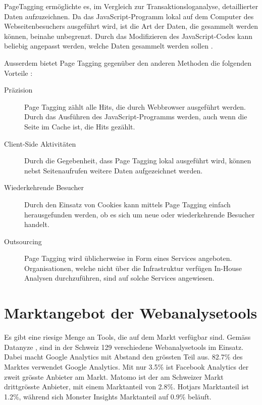 PageTagging ermöglichte es, im Vergleich zur Transaktionsloganalyse, detaillierter Daten aufzuzeichnen. Da das JavaScript-Programm lokal auf dem Computer des Webseitenbesuchers ausgeführt wird, ist die Art der Daten, die gesammelt werden können, beinahe unbegrenzt. Durch das Modifizieren des JavaScript-Codes kann beliebig angepasst werden, welche Daten gesammelt werden sollen \parencite[S. 3]{waisberg2009webShort}. 

Ausserdem bietet Page Tagging gegenüber den anderen Methoden die folgenden Vorteile \parencite[S. 174]{nakatani2011toolselectionmethod}:

\begin{description}
  \item[Präzision] Page Tagging zählt alle Hits, die durch Webbrowser ausgeführt werden. Durch das Ausführen des JavaScript-Programms werden, auch wenn die Seite im Cache ist, die Hits gezählt.
  \item[Client-Side Aktivitäten] Durch die Gegebenheit, dass Page Tagging lokal ausgeführt wird, können nebst Seitenaufrufen weitere Daten aufgezeichnet werden.
  \item[Wiederkehrende Besucher] Durch den Einsatz von Cookies kann mittels Page Tagging einfach herausgefunden werden, ob es sich um neue oder wiederkehrende Besucher handelt.
  \item[Outsourcing] Page Tagging wird üblicherweise in Form eines Services angeboten. Organisationen, welche nicht über die Infrastruktur verfügen In-House Analysen durchzuführen, sind auf solche Services angewiesen.
\end{description}


\newpage
\section{Marktangebot der Webanalysetools}\label{sec:marktangebotwebanalyse}
Es gibt eine riesige Menge an Tools, die auf dem Markt verfügbar sind. Gemäss Datanyze \parencite*{datanyzeSwitzerlandWebanalytics}, sind in der Schweiz 129 verschiedene Webanalysetools im Einsatz. Dabei macht Google Analytics mit Abstand den grössten Teil aus. 82.7\% des Marktes verwendet Google Analytics. Mit nur 3.5\% ist Facebook Analytics der zweit grösste Anbieter am Markt. Matomo ist der am Schweizer Markt drittgrösste Anbieter, mit einem Marktanteil von 2.8\%. Hotjars Marktanteil ist 1.2\%, während sich Monster Insights Marktanteil auf 0.9\% beläuft. 

